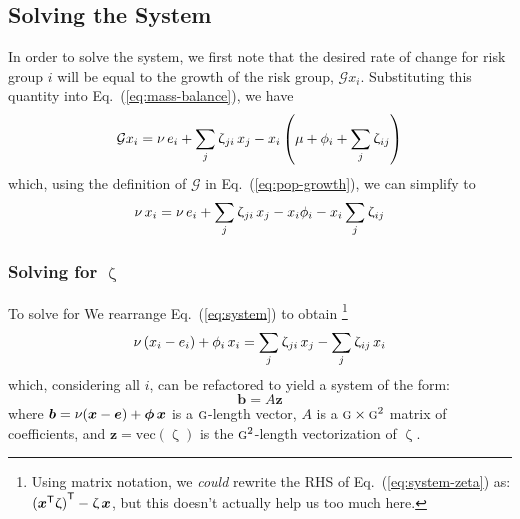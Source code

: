 \documentclass{article}
\numberwithin{equation}{section}
\newcommand{\eq}[1]{Eq.~(\ref{#1})}
\renewcommand{\zeta}{\upzeta}
\newcommand{\G}{\textsc{g}}
\begin{document}
\subsection{Solving the System}
In order to solve the system, we first note that the desired rate of change for risk group $i$
will be equal to the growth of the risk group, $\mathcal{G} x_i$.
Substituting this quantity into \eq{eq:mass-balance}, we have
\begin{equation}
  \mathcal{G}x_i = \nu \thinspace e_i + \sum_{j}{\zeta_{ji} \thinspace x_j}
               - x_i \left( \mu + \phi_i + \sum_{j}{\zeta_{ij}} \right)
\end{equation}
which, using the definition of $\mathcal{G}$ in \eq{eq:pop-growth}, we can simplify to
\begin{equation}
  \nu \thinspace x_i
      = \nu \thinspace e_i + \sum_{j}{\zeta_{ji} \thinspace x_j}
       - x_i \phi_i - x_i \sum_{j}{\zeta_{ij}}
  \label{eq:system}
\end{equation}
\subsubsection{Solving for $\zeta$}
To solve for We rearrange \eq{eq:system} to obtain
\footnote{
  Using matrix notation, we \textit{could} rewrite the RHS of \eq{eq:system-zeta} as:
  ${({\bm{x}}^{\mathsf{T}}\zeta)}^{\mathsf{T}} - \zeta \thinspace \bm{x}$, %
  but this doesn't actually help us too much here.}
\begin{equation}\label{eq:system-zeta}
  \nu \left( x_i - e_i \right) + \phi_i \thinspace x_i
  = \sum_{j}{\zeta_{ji} \thinspace x_j}
  - \sum_{j}{\zeta_{ij} \thinspace x_i}
\end{equation}
which, considering all $i$, can be refactored to yield a system of the form:
\begin{equation}
\bm{b} = A \bm{z}
\end{equation}
where
$\bm{b} = \nu (\bm{x} - \bm{e}) + \bm{\phi} \thinspace \bm{x}$ is a $\G$-length vector,
$A$ is a ${\G}\times\G^2$ matrix of coefficients, and
$\bm{z} = \mathrm{vec}(\zeta)$ is the $\G^2$-length vectorization of $\zeta$.
\end{document}
